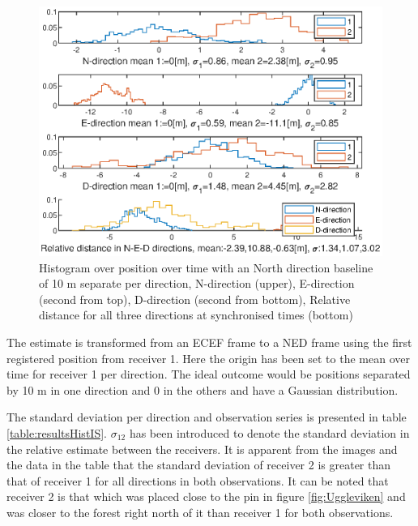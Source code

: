 \begin{figure}
\centering
\includegraphics[width=\textwidth]{Results/GPShist10mE.eps}
\caption{\label{fig:histE} Histogram over position over time with an North direction baseline of 10 m separate per direction, N-direction (upper), E-direction (second from top), D-direction (second from bottom), Relative distance for all three directions at synchronised times (bottom)}
\end{figure}
The estimate is transformed from an ECEF frame to a NED frame using the first registered position from receiver 1. Here the origin has been set to the mean over time for receiver 1 per direction. The ideal outcome would be positions separated by 10 m in one direction and 0 in the others and have a Gaussian distribution. 
\par
The standard deviation per direction and observation series is presented in table \ref{table:resultsHistIS}. $\sigma_{12}$ has been introduced to denote the standard deviation in the relative estimate between the receivers. It is apparent from the images and the data in the table that the standard deviation of receiver 2 is greater than that of receiver 1 for all directions in both observations. It can be noted that receiver 2 is that which was placed close to the pin in figure \ref{fig:Uggleviken} and was closer to the forest right north of it than receiver 1 for both observations.
